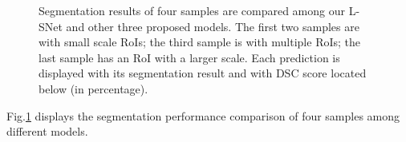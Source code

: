 \documentclass{article}
\begin{document}
\begin{figure}[ht]
    \centering
    \caption{
    Segmentation results of four samples are compared among our L-SNet and other three proposed models. The first two samples are with small scale RoIs; the third sample is with multiple RoIs; the last sample has an RoI with a larger scale. Each prediction is displayed with its segmentation result and with DSC score located below (in percentage).}
    \label{fig:s2}
\end{figure}


Fig.\ref{fig:s2} displays the segmentation performance comparison of four samples among different models.
\end{document}

